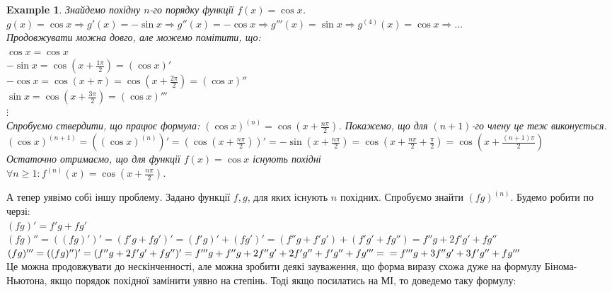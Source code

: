 \documentclass[a4paper, 14pt]{article}
\theoremstyle{theoremdd}
\theoremstyle{theoremdd}
\theoremstyle{theoremdd}
\theoremstyle{theoremdd}
\newtheorem{example}[theorem]{Example}
\theoremstyle{theoremdd}
\theoremstyle{theoremdd}
\theoremstyle{theoremdd}
\theoremstyle{theoremdd}
\begin{document}
\begin{example}
Знайдемо похідну $n$-го порядку функції $f(x) = \cos x$.\\
$g(x) = \cos x \Rightarrow g'(x) = -\sin x \Rightarrow g''(x) = -\cos x \Rightarrow g'''(x) = \sin x \Rightarrow g^{(4)}(x) = \cos x \Rightarrow \dots$\\
Продовжувати можна довго, але можемо помітити, що:\\
$\cos x = \cos x$\\
$- \sin x = \displaystyle \cos \left(x + \frac{1\pi}{2} \right) = (\cos x)'$\\
$- \cos x = \displaystyle \cos \left(x + \pi \right) = \cos \left(x + \frac{2 \pi}{2} \right) = (\cos x)''$\\
$ \sin x = \displaystyle \cos \left(x + \frac{3\pi}{2} \right) = (\cos x)'''$\\
$\vdots$\\
Спробуємо ствердити, що працює формула: $(\cos x)^{(n)} = \displaystyle \cos \left(x + \frac{n\pi}{2} \right)$. Покажемо, що для $(n+1)$-го члену це теж виконується.\\
$(\cos x)^{(n+1)} = \left((\cos x)^{(n)}\right)' = \displaystyle \left( \cos \left(x + \frac{n\pi}{2} \right) \right)' = -\sin \left(x + \frac{n\pi}{2} \right) = \cos \left(x + \frac{n\pi}{2} + \frac{\pi}{2} \right) = \cos \left(x + \frac{(n+1)\pi}{2} \right)$\\
Остаточно отримаємо, що для функції $f(x) = \cos x$ існують похідні\\
$\forall n \geq 1: f^{(n)}(x) = \displaystyle \cos \left(x + \frac{n\pi}{2} \right)$.
\end{example}

А тепер уявімо собі іншу проблему. Задано функції $f,g$, для яких існують $n$ похідних. Спробуємо знайти $(fg)^{(n)}$. Будемо робити по черзі:\\
$(fg)' = f'g+fg'$\\
$(fg)''=((fg)')'=(f'g+fg')'=(f'g)'+(fg')'=(f''g+f'g')+(f'g'+fg'')= f''g + 2f'g' + fg''$\\
$(fg)''' = ((fg)'')' = (f''g + 2f'g' + fg'')' = f'''g+f''g+2f''g'+2f'g''+f'g''+fg''' = \\ = f'''g + 3f''g' + 3f'g'' + fg'''$\\
Це можна продовжувати до нескінченності, але можна зробити деякі зауваження, що форма виразу схожа дуже на формулу Бінома-Ньютона, якщо порядок похідної замінити уявно на степінь. Тоді якщо посилатись на МІ, то доведемо таку формулу:
\end{document}
